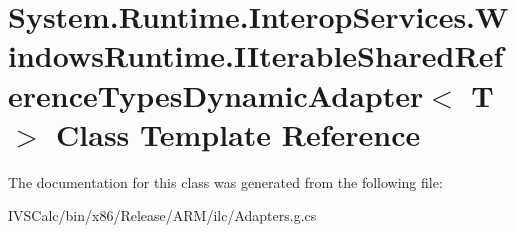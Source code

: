 \hypertarget{class_system_1_1_runtime_1_1_interop_services_1_1_windows_runtime_1_1_i_iterable_shared_reference_types_dynamic_adapter}{}\section{System.\+Runtime.\+Interop\+Services.\+Windows\+Runtime.\+I\+Iterable\+Shared\+Reference\+Types\+Dynamic\+Adapter$<$ T $>$ Class Template Reference}
\label{class_system_1_1_runtime_1_1_interop_services_1_1_windows_runtime_1_1_i_iterable_shared_reference_types_dynamic_adapter}


The documentation for this class was generated from the following file\+:\begin{DoxyCompactItemize}
\item 
I\+V\+S\+Calc/bin/x86/\+Release/\+A\+R\+M/ilc/Adapters.\+g.\+cs\end{DoxyCompactItemize}
